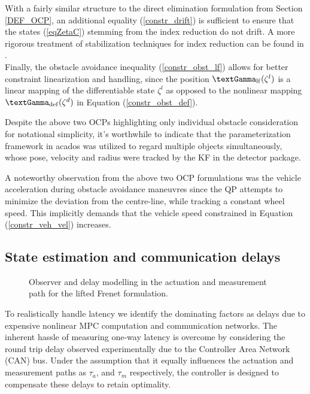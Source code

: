 With a fairly similar structure to the direct elimination formulation from Section \ref{DEF_OCP}, an additional equality (\ref{constr_drift}) is sufficient to ensure that the states (\ref{eqZetaC}) stemming from the index reduction do not drift. A more rigorous treatment of stabilization techniques for index reduction can be found in \cite{campbell_applications_2019}.\\
Finally, the obstacle avoidance inequality (\ref{constr_obst_lf}) allows for better constraint linearization and handling, since the position $\textGamma_{\mathrm{lf}}(\zeta^{l})$ is a linear mapping of the differentiable state $\zeta^{l}$ as opposed to the nonlinear mapping $\textGamma_{\mathrm{def}}(\zeta^{d})$ in Equation (\ref{constr_obst_def}).

\par Despite the above two \ac{OCP}s highlighting only individual obstacle consideration for notational simplicity, it's worthwhile to indicate that the parameterization framework in acados was utilized to regard multiple objects simultaneously, whose pose, velocity and radius were tracked by the \ac{KF} in the detector package.
\par A noteworthy observation from the above two \ac{OCP} formulations was the vehicle acceleration during obstacle avoidance maneuvres since the QP attempts to minimize the deviation from the centre-line, while tracking a constant wheel speed. This implicitly demands that the vehicle speed constrained in Equation (\ref{constr_veh_vel}) increases. 
\subsection{State estimation and communication delays}
\hfill \break
\begin{figure}[t]
    \begin{center}
        \def\svgwidth{0.75\textwidth}
        
        \caption{Observer and delay modelling in the actuation and measurement path for the lifted Frenet formulation.}
        \label{zeta_obs}
    \end{center}
\end{figure}
To realistically handle latency we identify the dominating factors as delays due to expensive nonlinear \ac{MPC} computation and communication networks.
The inherent hassle of measuring one-way latency is overcome by considering the round trip delay observed experimentally due to the Controller Area Network (CAN) bus. Under the assumption that it equally influences the actuation and measurement paths as $\tau_{a}$, and $\tau_{m}$ respectively, the controller is designed to compensate these delays to retain optimality. 

